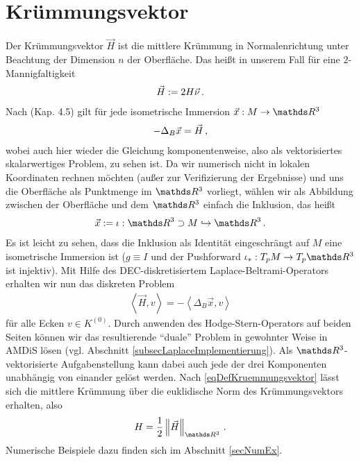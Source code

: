\section{Krümmungsvektor}
  Der Krümmungsvektor \( \vec{H} \) ist die mittlere Krümmung in Normalenrichtung unter Beachtung der Dimension \( n \) der Oberfläche.
  Das heißt in unserem Fall für eine \( 2 \)-Mannigfaltigkeit
  \begin{align}
    \label{eqDefKruemmungsvektor}
    \vec{H} := 2 H \vec{\nu} \,\text{.}
  \end{align}
  Nach \cite{chen} (Kap. 4.5) gilt für jede isometrische Immersion \( \vec{x}:M\rightarrow \R^{3} \)
  \begin{align}
    -\Delta_{B}\vec{x} = \vec{H} \,\text{,}
  \end{align}
  wobei auch hier wieder die Gleichung komponentenweise, also als vektorisiertes skalarwertiges Problem, zu sehen ist.
  Da wir numerisch nicht in lokalen Koordinaten rechnen möchten (außer zur Verifizierung der Ergebnisse) und uns die Oberfläche als
  Punktmenge im \( \R^{3} \) vorliegt, wählen wir als Abbildung zwischen der Oberfläche und dem \( \R^{3} \) einfach die Inklusion, das heißt
  \begin{align}
    \vec{x}:= \iota: \R^{3}\supset M \hookrightarrow \R^{3} \formpunkt
  \end{align}
  Es ist leicht zu sehen, dass die Inklusion als Identität eingeschrängt auf \( M \) eine isometrische Immersion ist 
  (\( g\equiv I \) und der Pushforward \( \iota_{*}:T_{p}M \rightarrow T_{p}\R^{3} \) ist injektiv).
  Mit Hilfe des DEC-diskretisiertem Laplace-Beltrami-Operators erhalten wir nun das diskreten Problem
  \begin{align}
    \label{eqProbLX}
    \left\langle \vec{H}, v \right\rangle = - \left\langle \Delta_{B}\vec{x} , v \right\rangle
  \end{align}
  für alle Ecken \( v\in K^{(0)} \).
  Durch anwenden des Hodge-Stern-Operators auf beiden Seiten können wir das resultierende "`duale"' Problem in gewohnter Weise in AMDiS
  lösen (vgl. Abschnitt \ref{subsecLaplaceImplementierung}).
  Als \( \R^{3} \)-vektorisierte Aufgabenstellung kann dabei auch jede der drei Komponenten unabhängig von einander gelöst werden.
  Nach \eqref{eqDefKruemmungsvektor} lässt sich die mittlere Krümmung über die euklidische Norm des Krümmungsvektors erhalten, also
  \begin{align}
    H = \frac{1}{2}\left\| \vec{H} \right\|_{\R^{3}} \formpunkt
  \end{align}
  Numerische Beispiele dazu finden sich im Abschnitt \ref{secNumEx}.

